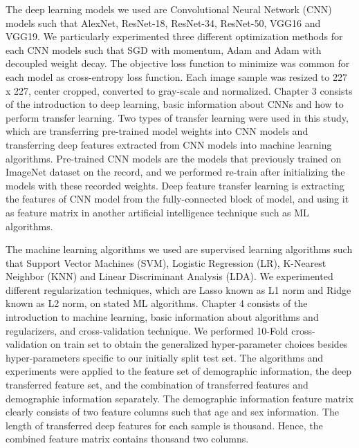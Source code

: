 The deep learning models we used are Convolutional Neural Network (CNN) models such that AlexNet, ResNet-18, ResNet-34, ResNet-50, VGG16 and VGG19. We particularly experimented three different optimization methods for each CNN models such that SGD with momentum, Adam and Adam with decoupled weight decay. The objective loss function to minimize was common for each model as cross-entropy loss function. Each image sample was resized to 227 x 227, center cropped, converted to gray-scale and normalized. Chapter 3 consists of the introduction to deep learning, basic information about CNNs and how to perform transfer learning. Two types of transfer learning were used in this study, which are transferring pre-trained model weights into CNN models and transferring deep features extracted from CNN models into machine learning algorithms. Pre-trained CNN models are the models that previously trained on ImageNet dataset on the record, and we performed re-train after initializing the models with these recorded weights. Deep feature transfer learning is extracting the features of CNN model from the fully-connected block of model, and using it as feature matrix in another artificial intelligence technique such as ML algorithms.

The machine learning algorithms we used are supervised learning algorithms such that Support Vector Machines (SVM), Logistic Regression (LR), K-Nearest Neighbor (KNN) and Linear Discriminant Analysis (LDA). We experimented different regularization techniques, which are Lasso known as L1 norm and Ridge known as L2 norm, on stated ML algorithms. Chapter 4 consists of the introduction to machine learning, basic information about algorithms and regularizers, and cross-validation technique. We performed 10-Fold cross-validation on train set to obtain the generalized hyper-parameter choices besides hyper-parameters specific to our initially split test set. The algorithms and experiments were applied to the feature set of demographic information, the deep transferred feature set, and the combination of transferred features and demographic information separately. The demographic information feature matrix clearly consists of two feature columns such that age and sex information. The length of transferred deep features for each sample is thousand. Hence, the combined feature matrix contains  thousand two columns.

